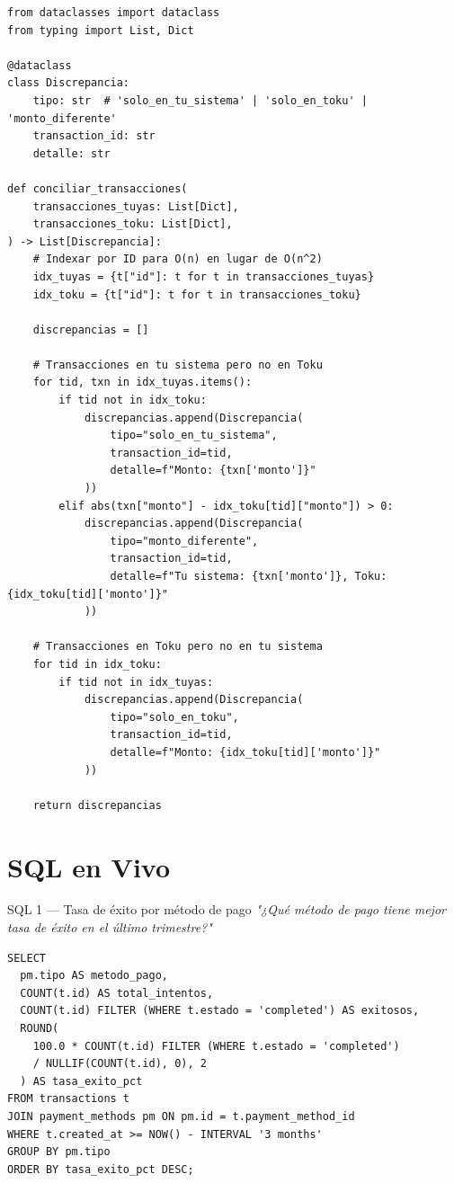 \documentclass[11pt,a4paper]{article}
\begin{document}
\begin{respuestabox}
\begin{lstlisting}[style=python]
from dataclasses import dataclass
from typing import List, Dict

@dataclass
class Discrepancia:
    tipo: str  # 'solo_en_tu_sistema' | 'solo_en_toku' | 'monto_diferente'
    transaction_id: str
    detalle: str

def conciliar_transacciones(
    transacciones_tuyas: List[Dict],
    transacciones_toku: List[Dict],
) -> List[Discrepancia]:
    # Indexar por ID para O(n) en lugar de O(n^2)
    idx_tuyas = {t["id"]: t for t in transacciones_tuyas}
    idx_toku = {t["id"]: t for t in transacciones_toku}

    discrepancias = []

    # Transacciones en tu sistema pero no en Toku
    for tid, txn in idx_tuyas.items():
        if tid not in idx_toku:
            discrepancias.append(Discrepancia(
                tipo="solo_en_tu_sistema",
                transaction_id=tid,
                detalle=f"Monto: {txn['monto']}"
            ))
        elif abs(txn["monto"] - idx_toku[tid]["monto"]) > 0:
            discrepancias.append(Discrepancia(
                tipo="monto_diferente",
                transaction_id=tid,
                detalle=f"Tu sistema: {txn['monto']}, Toku: {idx_toku[tid]['monto']}"
            ))

    # Transacciones en Toku pero no en tu sistema
    for tid in idx_toku:
        if tid not in idx_tuyas:
            discrepancias.append(Discrepancia(
                tipo="solo_en_toku",
                transaction_id=tid,
                detalle=f"Monto: {idx_toku[tid]['monto']}"
            ))

    return discrepancias
\end{lstlisting}
\end{respuestabox}

\section{SQL en Vivo}

\begin{preguntabox}{SQL 1 — Tasa de éxito por método de pago}
\textit{"¿Qué método de pago tiene mejor tasa de éxito en el último trimestre?"}
\end{preguntabox}

\begin{respuestabox}
\begin{lstlisting}[style=sql]
SELECT
  pm.tipo AS metodo_pago,
  COUNT(t.id) AS total_intentos,
  COUNT(t.id) FILTER (WHERE t.estado = 'completed') AS exitosos,
  ROUND(
    100.0 * COUNT(t.id) FILTER (WHERE t.estado = 'completed')
    / NULLIF(COUNT(t.id), 0), 2
  ) AS tasa_exito_pct
FROM transactions t
JOIN payment_methods pm ON pm.id = t.payment_method_id
WHERE t.created_at >= NOW() - INTERVAL '3 months'
GROUP BY pm.tipo
ORDER BY tasa_exito_pct DESC;
\end{lstlisting}
\end{respuestabox}
\end{document}
